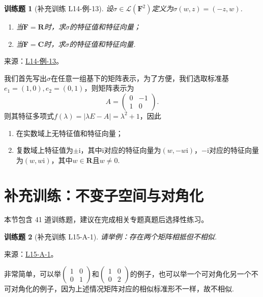\documentclass[12pt,fontset=fandol]{ctexart}
\newtheorem{exercise}{训练题}[section]
\begin{document}
\begin{exercise}[补充训练 L14-例-13]\label{prob:L14-例-13}
设$\sigma\in\mathcal{L}(\mathbf{F}^2)$定义为$\sigma(w,z)=(-z,w)$.
    \begin{enumerate}
        \item 当$\mathbf{F}=\mathbf{R}$时，求$\sigma$的特征值和特征向量；

        \item 当$\mathbf{F}=\mathbf{C}$时，求$\sigma$的特征值和特征向量.
    \end{enumerate}
\end{exercise}
\noindent 来源：\href{https://github.com/yhwu-is/Linear-Algebra-Left-Undone/blob/new/%E8%AE%B2%E4%B9%89/%E4%B8%93%E9%A2%98/14%20%E7%9B%B8%E4%BC%BC%E6%A0%87%E5%87%86%E5%BD%A2%EF%BC%9A%E5%8A%A8%E6%9C%BA%E4%B8%8E%E5%9F%BA%E7%A1%80.tex}{L14-例-13}。
\begin{solve}
我们首先写出$\sigma$在任意一组基下的矩阵表示，为了方便，我们选取标准基$e_1=(1,0),e_2=(0,1)$，则矩阵表示为
    \[ A=\begin{pmatrix}
            0 & -1 \\ 1 & 0
        \end{pmatrix}. \]
    则其特征多项式$f(\lambda)=|\lambda E-A|=\lambda^2+1$，因此
    \begin{enumerate}
        \item 在实数域上无特征值和特征向量；

        \item 复数域上特征值为$\pm\mathrm{i}$，其中$\mathrm{i}$对应的特征向量为$(w,-w\mathrm{i})$，$-\mathrm{i}$对应的特征向量为$(w,w\mathrm{i})$，其中$w\in\mathbf{R}$且$w\neq 0$.
    \end{enumerate}
\end{solve}

\section{补充训练：不变子空间与对角化}

本节包含 41 道训练题，建议在完成相关专题真题后选择性练习。

\begin{exercise}[补充训练 L15-A-1]\label{prob:L15-A-1}
请举例：存在两个矩阵相抵但不相似.
\end{exercise}
\noindent 来源：\href{https://github.com/yhwu-is/Linear-Algebra-Left-Undone/blob/new/%E8%AE%B2%E4%B9%89/%E4%B8%93%E9%A2%98/15%20%E7%9B%B8%E4%BC%BC%E6%A0%87%E5%87%86%E5%BD%A2%EF%BC%9A%E5%A4%8D%E6%95%B0%E5%9F%9F%E4%B8%8A%E7%9A%84%E5%B0%9D%E8%AF%95%E4%B8%8E%E7%90%86%E8%AE%BA.tex}{L15-A-1}。
\begin{solve}
非常简单，可以举$\begin{pmatrix}
                1 & 0 \\ 0 & 1
            \end{pmatrix}$和$\begin{pmatrix}
                1 & 0 \\ 0 & 2
            \end{pmatrix}$的例子，也可以举一个可对角化另一个不可对角化的例子，因为上述情况矩阵对应的相似标准形不一样，故不相似.
\end{solve}
\end{document}
